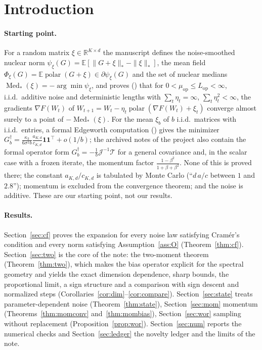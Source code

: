 \documentclass[10pt]{article}
\theoremstyle{definition}
\theoremstyle{remark}
\newcommand{\R}{\mathbb{R}}
\newcommand{\E}{\mathbb{E}}
\newcommand{\nnuc}[1]{\|#1\|_{*}}
\newcommand{\polar}{\operatorname{polar}}
\newcommand{\Med}{\operatorname{Med}}
\newcommand{\ones}{\mathbf{1}}
\newcommand{\Lop}{L_{\mathrm{op}}}
\newcommand{\muop}{\mu_{\mathrm{op}}}
\newcommand{\st}{\dagger}
\begin{document}
\section{Introduction}

\paragraph{Starting point.} For a random matrix $\xi\in\R^{K\times d}$ the manuscript \cite{manuscript} defines the
noise-smoothed nuclear norm $\psi_\xi(G)=\E[\nnuc{G+\xi}-\nnuc\xi]$, the mean field $\Phi_\xi(G)=\E\polar(G+\xi)\in
\partial\psi_\xi(G)$ and the set of nuclear medians $\Med_\ast(\xi)=-\arg\min\psi_\xi$, and proves
(\cite[Theorem~2]{manuscript}) that for $0<\muop\le\Lop<\infty$, i.i.d.\ additive noise and deterministic lengths
with $\sum_t\eta_t=\infty$, $\sum_t\eta_t^2<\infty$, the gradients $\nabla F(W_t)$ of
$W_{t+1}=W_t-\eta_t\polar(\nabla F(W_t)+\xi_t)$ converge almost surely to a point of $-\Med_\ast(\xi)$. For the mean
$\xi_b$ of $b$ i.i.d.\ matrices with i.i.d.\ entries, a formal Edgeworth computation
(\cite[Proposition~4]{manuscript}) gives the minimizer $G_b^\st=\frac{\kappa_3}{6\sigma^2b}\frac{a_{K,d}}{c_{K,d}}\ones\ones^\top+o(1/b)$;
the archived notes of the project also contain the formal operator form $G^\st_b=-\frac1b\mathcal J^{-1}\mathcal T$ for
a general covariance and, in the scalar case with a frozen iterate, the momentum factor
$\frac{1-\beta^2}{1+\beta+\beta^2}$. None of this is proved there; the constant $a_{K,d}/c_{K,d}$ is tabulated by
Monte Carlo (``$d\,a/c$ between $1$ and $2.8$''); momentum is excluded from the convergence theorem; and the noise is
additive. These are our starting point, not our results.

\paragraph{Results.} Section~\ref{sec:cf} proves the expansion for every noise law satisfying Cram\'er's condition and
every norm satisfying Assumption~\ref{ass:O} (Theorem~\ref{thm:cf}). Section~\ref{sec:two} is the core of the note: the two-moment theorem
(Theorem~\ref{thm:two}), which makes the bias operator explicit for the spectral geometry and yields the exact dimension
dependence, sharp bounds, the proportional limit, a sign structure and a comparison with sign descent and normalized
steps (Corollaries~\ref{cor:dim}--\ref{cor:compare}). Section~\ref{sec:state} treats parameter-dependent noise
(Theorem~\ref{thm:state}), Section~\ref{sec:mom} momentum (Theorems~\ref{thm:momconv} and~\ref{thm:mombias}),
Section~\ref{sec:wor} sampling without replacement (Proposition~\ref{prop:wor}). Section~\ref{sec:num} reports the
numerical checks and Section~\ref{sec:ledger} the novelty ledger and the limits of the note.
\end{document}

